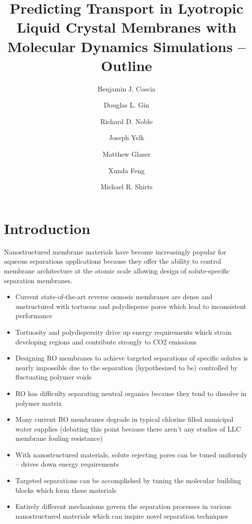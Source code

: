 \documentclass{article}
\title{Predicting Transport in Lyotropic Liquid Crystal Membranes with Molecular Dynamics Simulations -- Outline}
\author{Benjamin J. Coscia \and Douglas L. Gin \and Richard D. Noble \and Joseph Yelk \and Matthew Glaser \and Xunda Feng \and Michael R. Shirts}
\begin{document}
	
	\graphicspath{{./figures/}}
	\maketitle
	\section{Introduction}
	Nanostructured membrane materials have become increasingly popular for aqueous separations applications because they offer the ability to control membrane architecture at the atomic scale allowing design of solute-specific separation membranes.
	\begin{itemize}
		\item Current state-of-the-art reverse osmosis membranes are dense and unstructured with tortuous and polydisperse pores which lead to inconsistent performance
		\item Tortuosity and polydispersity drive up energy requirements which strain developing regions and contribute strongly to CO2 emissions
		\item Designing RO membranes to achieve targeted separations of specific solutes is nearly impossible due to the separation (hypothesized to be) controlled by fluctuating polymer voids
		\item RO has difficulty separating neutral organics because they tend to dissolve in polymer matrix
		\item Many current RO membranes degrade in typical chlorine filled municipal water supplies (debating this point because there aren't any studies of LLC membrane fouling resistance)
		\item With nanostructured materials, solute rejecting pores can be tuned uniformly -- drives down energy requirements
		\item Targeted separations can be accomplished by tuning the molecular building blocks which form these materials
		\item Entirely different mechanisms govern the separation processes in various nanostructured materials which can inspire novel separation techniques
	\end{itemize}
	
\end{document}
